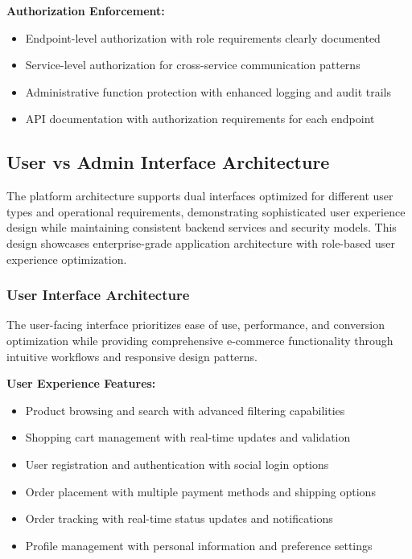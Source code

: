 \textbf{Authorization Enforcement:}
\begin{itemize}
\item Endpoint-level authorization with role requirements clearly documented
\item Service-level authorization for cross-service communication patterns
\item Administrative function protection with enhanced logging and audit trails
\item API documentation with authorization requirements for each endpoint
\end{itemize}

\subsection{User vs Admin Interface Architecture}

The platform architecture supports dual interfaces optimized for different user types and operational requirements, demonstrating sophisticated user experience design while maintaining consistent backend services and security models. This design showcases enterprise-grade application architecture with role-based user experience optimization.

\subsubsection{User Interface Architecture}

The user-facing interface prioritizes ease of use, performance, and conversion optimization while providing comprehensive e-commerce functionality through intuitive workflows and responsive design patterns.

\textbf{User Experience Features:}
\begin{itemize}
\item Product browsing and search with advanced filtering capabilities
\item Shopping cart management with real-time updates and validation
\item User registration and authentication with social login options
\item Order placement with multiple payment methods and shipping options
\item Order tracking with real-time status updates and notifications
\item Profile management with personal information and preference settings
\end{itemize}

